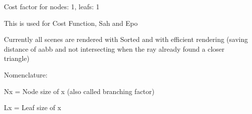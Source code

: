 \documentclass[12pt, a4paper]{report}
\newcommand{\branchf}{Branching Factor}
\newcommand{\leafs}{Leaf Size}
\newcommand{\leafi}{Leaf Intersection}
\newcommand{\nodei}{Node Intersection}
\newcommand{\sleafi}{Shadow Leaf Intersection}
\newcommand{\snodei}{Shadow Node Intersection}
\newcommand{\cost}{Cost Function}
\newcommand{\scost}{Shadow Cost Function}
\newcommand{\sah}{Sah}
\newcommand{\epo}{Epo}
\newcommand{\plotAll} [2]
{
\begin{figure}[!htb]
	\begin{minipage}[t]{0.4\textwidth} 
		\begin{tikzpicture}
		\begin{axis}
		[
		xlabel = \leafs,
		ylabel = \branchf,
		colorbar style={title=\leafi}
		]
		\addplot[matrix plot*,point meta=\thisrow{primaryLeafIntersections}]
		table[x = leafSize, y = branchFactor, col sep=comma]{#1};
		\end{axis}
		\end{tikzpicture}
	\end{minipage}\hfil \hfil
	\begin{minipage}[t]{0.4\textwidth}
		\begin{tikzpicture}
		\begin{axis}
		[
		xlabel = \leafs,
		colorbar style={title=\nodei}
		]
		\addplot[matrix plot*,point meta=\thisrow{primaryNodeIntersections}]
		table[x = leafSize, y = branchFactor, col sep=comma]{#1};
		\end{axis}
		\end{tikzpicture}
	\end{minipage}
	
	\begin{minipage}[t]{0.4\textwidth} 
		\begin{tikzpicture}
		\begin{axis}
		[
		xlabel = \leafs,
		ylabel = \branchf,
		colorbar style={title=\sleafi}
		]
		\addplot[matrix plot*,point meta=\thisrow{secondaryLeafIntersections}]
		table[x = leafSize, y = branchFactor, col sep=comma]{#1};
		\end{axis}
		\end{tikzpicture}
	\end{minipage}\hfil \hfil
	\begin{minipage}[t]{0.4\textwidth}
		\begin{tikzpicture}
		\begin{axis}
		[
		xlabel = \leafs,
		colorbar style={title=\snodei}
		]
		\addplot[matrix plot*,point meta=\thisrow{secondaryNodeIntersections}]
		table[x = leafSize, y = branchFactor, col sep=comma]{#1};
		\end{axis}
		\end{tikzpicture}
	\end{minipage}
	
	\begin{minipage}[t]{0.4\textwidth}
		\begin{tikzpicture}
		\begin{axis}
		[
		xlabel = \leafs,
		ylabel = \branchf,
		colorbar style={title=\cost}
		]
		\addplot[matrix plot*,point meta=\thisrow{PrimaryCost}]
		table[x = leafSize, y = branchFactor, col sep=comma]{#1};
		\end{axis}
		\end{tikzpicture}
	\end{minipage}\hfil\hfil
	\begin{minipage}[t]{0.4\textwidth}
		
		\begin{tikzpicture}
		\begin{axis}
		[
		xlabel = \leafs,
		colorbar style={title=\scost}
		]
		\addplot[matrix plot*,point meta=\thisrow{SecondaryCost}]
		table[x = leafSize, y = branchFactor, col sep=comma]{#1};
		\end{axis}
		\end{tikzpicture}
	\end{minipage}

	\begin{minipage}[t]{0.4\textwidth}
		\begin{tikzpicture}
		\begin{axis}
		[
		xlabel = \leafs,
		ylabel = \branchf,
		colorbar style={title=\sah}
		]
		\addplot[matrix plot*,point meta=\thisrow{Sah}]
		table[x = leafSize, y = branchFactor, col sep=comma]{#1};
		\end{axis}
		\end{tikzpicture}
	\end{minipage}\hfil\hfil
	\begin{minipage}[t]{0.4\textwidth}
		\begin{tikzpicture}
		\begin{axis}
		[
		xlabel = \leafs,
		colorbar style={title=\epo}
		]
		\addplot[matrix plot*,point meta=\thisrow{Epo}]
		table[x = leafSize, y = branchFactor, col sep=comma]{#1};
		\end{axis}
		\end{tikzpicture}
	\end{minipage}
	\caption{#2}
\end{figure}
\newpage
}
\begin{document}
Cost factor for nodes: 1, leafs: 1

This is used for Cost Function, Sah and Epo

Currently all scenes are rendered with Sorted and with efficient rendering (saving distance of aabb and not intersecting when the ray already found a closer triangle)

Nomenclature:

Nx = Node size of x (also called branching factor)

Lx = Leaf size of x

\iffalse

\fi

\iftrue

\fi











\iffalse
\plotAll{Data/shiftHappensTableWithSpaceSorted.txt}{Shift happens \url{https://sketchfab.com/3d-models/shift-happens-canyon-diorama-ffd36dfbfda8432d97388988883f6295}. Low poly scene. 53,857 Vertices and 240,865 Triangles. Sorted}

\plotAll{Data/sponzaTableWithSpaceSorted.txt}{Sponza \url{http://casual-effects.com/data/index.html}. Interior scene. 192,676 Vertices and 262,267 Triangles. Sorted}

\plotAll{Data/rungholtTableWithSpaceSorted.txt}{Rungholt \url{http://casual-effects.com/data/index.html}. Large minecraft city. 11,630,990 Vertices and 5,815,444 Triangles. Sorted}

\plotAll{Data/eratoTableWithSpaceSorted.txt}{Erato \url{http://casual-effects.com/data/index.html}. Scan of a marble statue. 235,332 Vertices and 412,669 Triangles. Sorted}

\plotAll{Data/AverageTableWithSpaceSorted.txt}{Average of all normalized results. Sorted}
\fi
\end{document}
